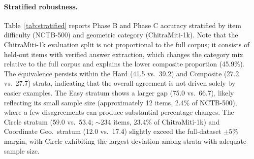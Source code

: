 \documentclass[11pt]{article}
\begin{document}
\begin{table}[ht]
\centering
\footnotesize
{}
\caption{95\% bootstrap confidence intervals for NCTB-500 phase accuracies (Table~\ref{tab:nctb_results}).}
\label{tab:nctb_ci}
\end{table}

\paragraph{Stratified robustness.} 
Table~\ref{tab:stratified} reports Phase B and Phase C accuracy stratified by item difficulty (NCTB-500) and geometric category (ChitraMiti-1k). Note that the ChitraMiti-1k evaluation split is not proportional to the full corpus; it consists of held-out items with verified answer extraction, which changes the category mix relative to the full corpus and explains the lower composite proportion (45.9\%). The equivalence persists within the Hard (41.5 vs.\ 39.2) and Composite (27.2 vs.\ 27.7) strata, indicating that the overall agreement is not driven solely by easier examples. The Easy stratum shows a larger gap (75.0 vs.\ 66.7), likely reflecting its small sample size (approximately 12 items, 2.4\% of NCTB-500), where a few disagreements can produce substantial percentage changes. The Circle stratum (59.0 vs.\ 53.4; $\sim$234 items, 23.4\% of ChitraMiti-1k) and Coordinate Geo.\ stratum (12.0 vs.\ 17.4) slightly exceed the full-dataset $\pm5$\% margin, with Circle exhibiting the largest deviation among strata with adequate sample size.
\end{document}
